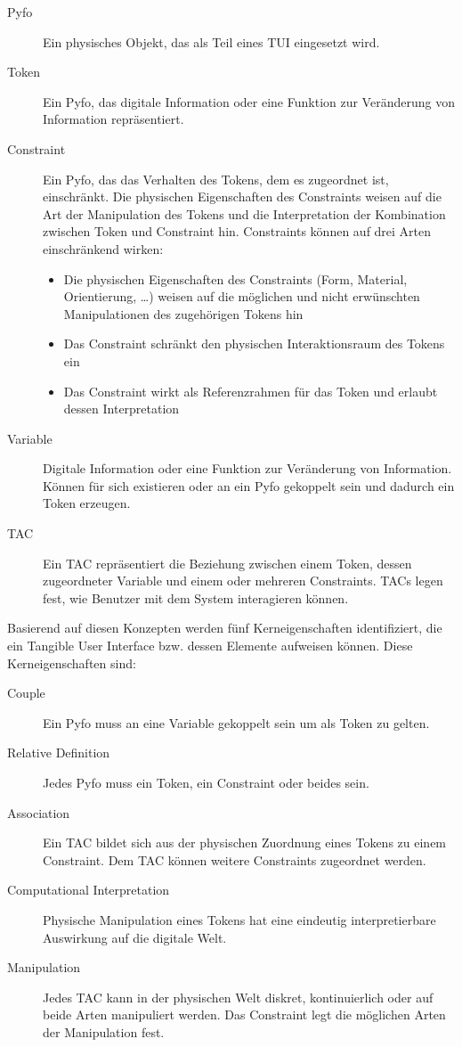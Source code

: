 \begin{description}
 \item[Pyfo] Ein physisches Objekt, das als Teil eines \gls{TUI} eingesetzt wird.
 \item[Token] Ein Pyfo, das digitale Information oder eine Funktion zur Veränderung von Information repräsentiert.
 \item[Constraint] Ein Pyfo, das das Verhalten des Tokens, dem es zugeordnet ist, einschränkt. Die physischen Eigenschaften des Constraints weisen auf die Art der Manipulation des Tokens und die Interpretation der Kombination zwischen Token und Constraint hin. Constraints können auf drei Arten einschränkend wirken:
  \begin{itemize}
   \item Die physischen Eigenschaften des Constraints (Form, Material, Orientierung, \ldots) weisen auf die möglichen und nicht erwünschten Manipulationen des zugehörigen Tokens hin
   \item Das Constraint schränkt den physischen Interaktionsraum des Tokens ein
   \item Das Constraint wirkt als Referenzrahmen für das Token und erlaubt dessen Interpretation
  \end{itemize}
 \item[Variable] Digitale Information oder eine Funktion zur Veränderung von Information. Können für sich existieren oder an ein Pyfo gekoppelt sein und dadurch ein Token erzeugen.
 \item[TAC] Ein \gls{TAC} repräsentiert die Beziehung zwischen einem Token, dessen zugeordneter Variable und einem oder mehreren Constraints. \glspl{TAC} legen fest, wie Benutzer mit dem System interagieren können.
\end{description}

Basierend auf diesen Konzepten werden fünf Kerneigenschaften identifiziert, die ein Tangible User Interface bzw. dessen Elemente aufweisen können. Diese Kerneigenschaften sind:

\begin{description}
	\item[Couple] Ein Pyfo muss an eine Variable gekoppelt sein um als Token zu gelten.
	\item[Relative Definition] Jedes Pyfo muss ein Token, ein Constraint oder beides sein.
	\item[Association] Ein \gls{TAC} bildet sich aus der physischen Zuordnung eines Tokens zu einem Constraint. Dem \gls{TAC} können weitere Constraints zugeordnet werden.
	\item[Computational Interpretation] Physische Manipulation eines Tokens hat eine eindeutig interpretierbare Auswirkung auf die digitale Welt.
	\item[Manipulation] Jedes \gls{TAC} kann in der physischen Welt diskret, kontinuierlich oder auf beide Arten manipuliert werden. Das Constraint legt die möglichen Arten der Manipulation fest.  
\end{description}

